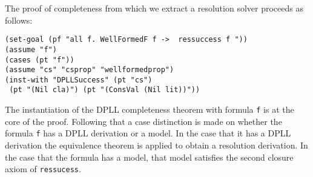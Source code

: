 The proof of completeness from which we extract a resolution solver proceeds as follows:

\begin{lstlisting}[caption = "Beginning of the Resolution Completeness Proof"]
(set-goal (pf "all f. WellFormedF f ->  ressuccess f "))
(assume "f")
(cases (pt "f"))
(assume "cs" "csprop" "wellformedprop")
(inst-with "DPLLSuccess" (pt "cs") 
 (pt "(Nil cla)") (pt "(ConsVal (Nil lit))"))
\end{lstlisting}

The instantiation of the DPLL completeness theorem with formula \texttt{f} is at the core of the proof. Following that a case distinction is made on whether the formula \texttt{f} has a DPLL derivation or a model. In the case that it has a DPLL derivation the equivalence theorem is applied to obtain a resolution derivation. In the case that the formula has a model, that model satisfies the second closure axiom of \texttt{ressucess}. 
